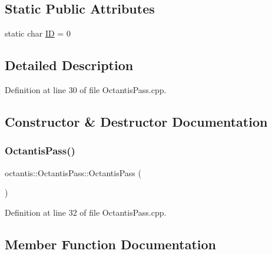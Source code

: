\subsection*{Static Public Attributes}
\begin{DoxyCompactItemize}
\item 
static char \hyperlink{structoctantis_1_1OctantisPass_a71e0902b7f244b6aa98ef9f3d34c8637}{ID} = 0
\end{DoxyCompactItemize}


\subsection{Detailed Description}


Definition at line 30 of file Octantis\+Pass.\+cpp.



\subsection{Constructor \& Destructor Documentation}
\mbox{\label{structoctantis_1_1OctantisPass_a47caf34ff1187522621d58f636579af7}} 
\subsubsection{\texorpdfstring{Octantis\+Pass()}{OctantisPass()}}
{\footnotesize\ttfamily octantis\+::\+Octantis\+Pass\+::\+Octantis\+Pass (\begin{DoxyParamCaption}{ }\end{DoxyParamCaption})\hspace{0.3cm}{\ttfamily [inline]}}



Definition at line 32 of file Octantis\+Pass.\+cpp.



\subsection{Member Function Documentation}
\mbox{\label{structoctantis_1_1OctantisPass_a9928748c5a25565dec5b98ccba4b12c3}} 
